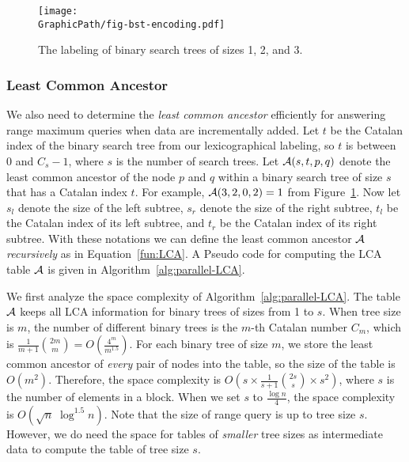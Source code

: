 \begin{figure}[!thb]
  \centering
  \texttt{[image: \\GraphicPath/fig-bst-encoding.pdf]}
  \caption{The labeling of binary search trees of sizes 1, 2, and 3.}
  \label{fig:labelingBST}
\end{figure}

\subsubsection{Least Common Ancestor}

We also need to determine the {\em least common ancestor} efficiently
for answering range maximum queries when data are incrementally added.
Let $t$ be the Catalan index of the binary search tree from our
lexicographical labeling, so $t$ is between 0 and $C_s-1$, where $s$
is the number of search trees.  Let ${\cal A}(s, t, p, q)$ denote the
least common ancestor of the node $p$ and $q$ within a binary search
tree of size $s$ that has a Catalan index $t$.  For example, ${\cal
  A}(3, 2, 0, 2) = 1$ from Figure~\ref{fig:labelingBST}.  Now let
$s_l$ denote the size of the left subtree, $s_r$ denote the size of
the right subtree, $t_l$ be the Catalan index of its left subtree, and
$t_r$ be the Catalan index of its right subtree.  With these notations
we can define the least common ancestor $\cal A$ {\em recursively} as
in Equation~\ref{fun:LCA}.  A Pseudo code for computing the LCA table
$\cal A$ is given in Algorithm~\ref{alg:parallel-LCA}.





We first analyze the space complexity of
Algorithm~\ref{alg:parallel-LCA}.  The table $\cal A$ keeps all LCA
information for binary trees of sizes from 1 to $s$.  When tree size is
$m$, the number of different binary trees is the $m$-th Catalan number
$C_m$, which is $\frac{1}{m+1}\binom{2m}{m}=O(\frac{4^m}{m^{1.5}})$.
For each binary tree of size $m$, we store the least common ancestor of
{\em every} pair of nodes into the table, so the size of the table is
$O(m^2)$.  Therefore, the space complexity is $O(s \times
\frac{1}{s+1}\binom{2s}{s} \times s^2)$, where $s$ is the number of
elements in a block.  When we set $s$ to $\frac{\log n}{4}$, the space
complexity is $O(\sqrt{n} \; \log ^{1.5} n)$.  Note that the size of
range query is up to tree size $s$.  However, we do need the space for
tables of {\em smaller} tree sizes as intermediate data to compute the
table of tree size $s$.

